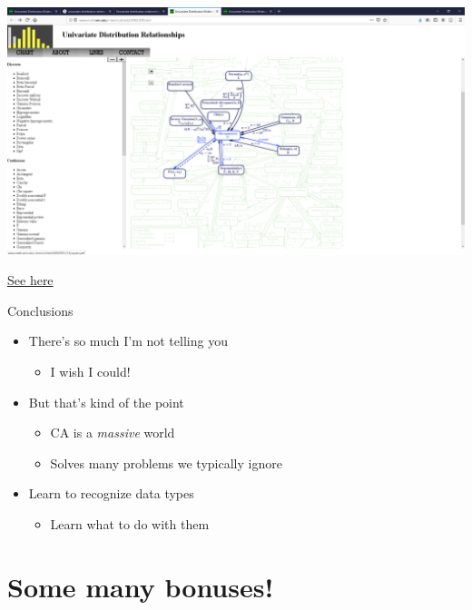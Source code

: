 \documentclass[
  ignorenonframetext,
]{beamer}
\providecommand{\tightlist}{%
  \setlength{\itemsep}{0pt}\setlength{\parskip}{0pt}}
\begin{document}
\begin{frame}

\includegraphics{../images/Chi2.PNG}

\href{http://www.math.wm.edu/~leemis/chart/UDR/UDR.html}{See here}

\end{frame}

\begin{frame}{Conclusions}
\protect\hypertarget{conclusions}{}

\begin{itemize}[<+->]
\tightlist
\item
  There's so much I'm not telling you

  \begin{itemize}[<+->]
  \tightlist
  \item
    I wish I could!
  \end{itemize}
\item
  But that's kind of the point

  \begin{itemize}[<+->]
  \tightlist
  \item
    CA is a \emph{massive} world
  \item
    Solves many problems we typically ignore
  \end{itemize}
\item
  Learn to recognize data types

  \begin{itemize}[<+->]
  \tightlist
  \item
    Learn what to do with them
  \end{itemize}
\end{itemize}

\end{frame}

\hypertarget{some-many-bonuses}{%
\section{Some many bonuses!}\label{some-many-bonuses}}
\end{document}
